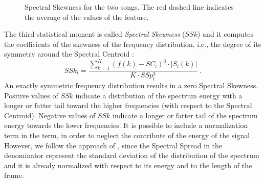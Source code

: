\begin{figure}[tb]
	\centering
	 \hfil
	\caption{Spectral Skewness for the two songs. The red dashed line indicates the average of the values of the feature.}
	\label{fig:LLFs:skewness}          
\end{figure}

The third statistical moment is called \textit{Spectral Skewness} ($SSk$) and it computes the coefficients of the skewness of the frequency distribution, i.e., the degree of its symmetry around the Spectral Centroid \cite{Tanghe2005}:
\begin{equation}\label{eq:FSSK}
SSk_l = \frac{\sum\limits_{k=1}^{K}(f(k)-SC_l)^3\cdot |S_l(k)|}{K\cdot SSp_l^3} \; .
\end{equation}
An exactly symmetric frequency distribution results in a zero Spectral Skewness. Positive values of $SSk$ indicate a distribution of the spectrum energy with a longer or fatter tail toward the higher frequencies (with respect to the Spectral Centroid). Negative values of $SSk$ indicate a longer or fatter tail of the spectrum energy towards the lower frequencies. It is possible to include a normalization term in the term, in order to neglect the contribute of the energy of the signal \cite{weihs2016music}. However, we follow the approach of \cite{Tanghe2005}, since the Spectral Spread in the denominator represent the standard deviation of the distribution of the spectrum and it is already normalized with respect to its energy and to the length of the frame.


